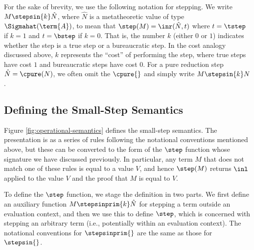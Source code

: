 \documentclass[acmsmall,screen,review,anonymous]{acmart}
\theoremstyle{remark}
\begin{document}
For the sake of brevity, we use the following notation for stepping. We write $M
\stepsin{k} \hat{N}$, where $\hat{N}$ is a metatheoretic value of type
$\Sigmahat(\term{A})$, to mean that $\step(M) = \inr (\hat{N}, t)$ where $t =
\tstep$ if $k = 1$ and $t = \bstep$ if $k = 0$. That is, the number $k$ (either
$0$ or $1$) indicates whether the step is a true step or a bureaucratic step. In
the cost analogy discussed above, $k$ represents the ``cost'' of performing the
step, where true steps have cost $1$ and bureaucratic steps have cost $0$.
%
For a pure reduction step $\hat{N} = \cpure(N)$, we often omit the $\cpure{}$ and
simply write $M \stepsin{k} N$.

\subsection{Defining the Small-Step Semantics}\label{sec:small-step-semantics}

Figure \ref{fig:operational-semantics} defines the small-step semantics. The
presentation is as a series of rules following the notational conventions
mentioned above, but these can be converted to the form of the $\step$ function
whose signature we have discussed previously.
%
%   
In particular, any term $M$ that does not match one of these rules is equal to a
value $V$, and hence $\step(M)$ returns $\inl$ applied to the value $V$ and the
proof that $M$ is equal to $V$.

To define the $\step$ function, we stage the definition in two parts. We first
define an auxiliary function $M \stepsinprim{k} \hat{N}$ for stepping a term
outside an evaluation context, and then we use this to define $\step$, which is
concerned with stepping an arbitrary term (i.e., potentially within an
evaluation context). The notational conventions for $\stepsinprim{}$ are the
same as those for $\stepsin{}$.

\end{document}
